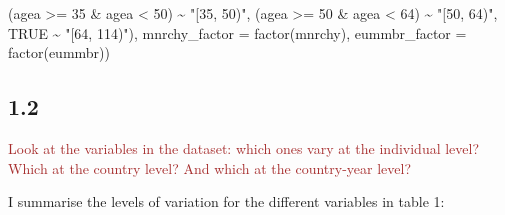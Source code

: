 \documentclass[
]{article}
\newenvironment{Shaded}{\begin{snugshade}}{\end{snugshade}}
\newcommand{\AttributeTok}[1]{\textcolor[rgb]{0.77,0.63,0.00}{#1}}
\newcommand{\ConstantTok}[1]{\textcolor[rgb]{0.00,0.00,0.00}{#1}}
\newcommand{\DecValTok}[1]{\textcolor[rgb]{0.00,0.00,0.81}{#1}}
\newcommand{\FunctionTok}[1]{\textcolor[rgb]{0.00,0.00,0.00}{#1}}
\newcommand{\NormalTok}[1]{#1}
\newcommand{\SpecialCharTok}[1]{\textcolor[rgb]{0.00,0.00,0.00}{#1}}
\newcommand{\StringTok}[1]{\textcolor[rgb]{0.31,0.60,0.02}{#1}}
\begin{document}
\begin{Shaded}
\begin{Highlighting}[]
\NormalTok{                            (agea }\SpecialCharTok{\textgreater{}=} \DecValTok{35} \SpecialCharTok{\&}\NormalTok{ agea }\SpecialCharTok{\textless{}} \DecValTok{50}\NormalTok{) }\SpecialCharTok{\textasciitilde{}} \StringTok{"[35, 50)"}\NormalTok{, }
\NormalTok{                            (agea }\SpecialCharTok{\textgreater{}=} \DecValTok{50} \SpecialCharTok{\&}\NormalTok{ agea }\SpecialCharTok{\textless{}} \DecValTok{64}\NormalTok{) }\SpecialCharTok{\textasciitilde{}} \StringTok{"[50, 64)"}\NormalTok{,}
                            \ConstantTok{TRUE} \SpecialCharTok{\textasciitilde{}} \StringTok{"[64, 114)"}\NormalTok{),}
         \AttributeTok{mnrchy\_factor =} \FunctionTok{factor}\NormalTok{(mnrchy), }
         \AttributeTok{eummbr\_factor =} \FunctionTok{factor}\NormalTok{(eummbr))}
\end{Highlighting}
\end{Shaded}

\hypertarget{section-1}{%
\subsection{1.2}\label{section-1}}

\textcolor{brown}{Look at the variables in the dataset: which ones vary at the individual level? Which at the country level? And which at the country-year level?}

I summarise the levels of variation for the different variables in table
1:
\end{document}
